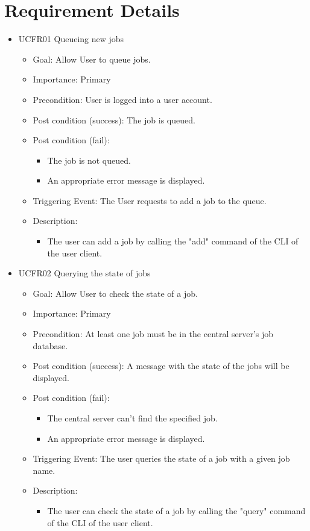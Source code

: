   \section{Requirement Details} 
    \begin{itemize}
    \item UCFR01 Queueing new jobs
    \begin{itemize}
      \item Goal: Allow User to queue jobs.
      \item Importance: Primary
      \item Precondition: User is logged into a user account.
      \item Post condition (success): The job is queued.
      \item Post condition (fail):
      \begin{itemize}
        \item The job is not queued.
        \item An appropriate error message is displayed.
      \end{itemize}
      \item Triggering Event: The User requests to add a job to the queue.
      \item Description:
      \begin{itemize}
        \item  The user can add a job by calling the "add" command of the CLI of the user client.
      \end{itemize}
    \end{itemize}
    
    \item UCFR02 Querying the state of jobs
    \begin{itemize}
      \item Goal: Allow User to check the state of a job.
      \item Importance: Primary
      \item Precondition: At least one job must be in the central server's job database.
      \item Post condition (success): A message with the state of the jobs will be displayed.
      \item Post condition (fail):
      \begin{itemize}
        \item The central server can't find the specified job.
        \item An appropriate error message is displayed.
      \end{itemize}
      \item Triggering Event: The user queries the state of a job with a given job name.
      \item Description:
      \begin{itemize}
        \item The user can check the state of a job by calling the "query" command of the CLI of the user client.
      \end{itemize}
    \end{itemize}
    

\end{itemize}
